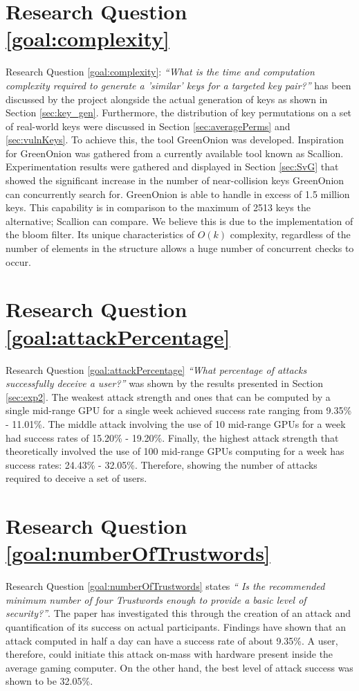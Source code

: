 \section{Research Question \ref{goal:complexity}}
Research Question \ref{goal:complexity}: \textit{``What is the time and computation complexity required to generate a ’similar’ keys for a targeted key pair?''} has been discussed by the project alongside the actual generation of keys as shown in Section \ref{sec:key_gen}. Furthermore, the distribution of key permutations on a set of real-world keys were discussed in Section \ref{sec:averagePerms} and \ref{sec:vulnKeys}. To achieve this, the tool GreenOnion was developed. Inspiration for GreenOnion was gathered from a currently available tool known as Scallion. Experimentation results were gathered and displayed in Section \ref{sec:SvG} that showed the significant increase in the number of near-collision keys GreenOnion can concurrently search for. GreenOnion is able to handle in excess of 1.5 million keys. This capability is in comparison to the maximum of 2513 keys the alternative; Scallion can compare. We believe this is due to the implementation of the bloom filter. Its unique characteristics of $O(k)$ complexity, regardless of the number of elements in the structure allows a huge number of concurrent checks to occur. 

\section{Research Question \ref{goal:attackPercentage}}
Research Question \ref{goal:attackPercentage} \textit{``What percentage of attacks successfully deceive a user?''} was shown by the results presented in Section \ref{sec:exp2}. The weakest attack strength and ones that can be computed by a single mid-range GPU for a single week achieved success rate ranging from 9.35\% - 11.01\%. The middle attack involving the use of 10 mid-range GPUs for a week had success rates of 15.20\% - 19.20\%. Finally, the highest attack strength that theoretically involved the use of 100 mid-range GPUs computing for a week has success rates: 24.43\% - 32.05\%. Therefore, showing the number of attacks required to deceive a set of users.

\section{Research Question \ref{goal:numberOfTrustwords}}
Research Question \ref{goal:numberOfTrustwords} states \textit{`` Is the recommended minimum number of four Trustwords enough to provide a basic level of security?''}. The paper has investigated this through the creation of an attack and quantification of its success on actual participants. Findings have shown that an attack computed in half a day can have a success rate of about 9.35\%. A user, therefore, could initiate this attack on-mass with hardware present inside the average gaming computer. On the other hand, the best level of attack success was shown to be 32.05\%. 

